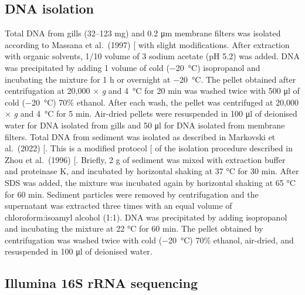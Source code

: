 \documentclass[
  12 pt,
]{article}
\begin{document}
\subsection{DNA isolation}\label{dna-isolation}

Total DNA from gills (32--123 \unit{\mg}) and 0.2 \unit{\um} membrane filters was isolated according to Massana et al.~(1997) {[}\citeproc{ref-Massana1997}{45}{]} with slight modifications. After extraction with organic solvents, 1/10 volume of 3 \unit{\Molar} sodium acetate (pH 5.2) was added. DNA was precipitated by adding 1 volume of cold (\qty{-20}{\degreeCelsius}) isopropanol and incubating the mixture for 1 \unit{\hour} or overnight at \qty{-20}{\degreeCelsius}. The pellet obtained after centrifugation at 20,000 × \emph{g} and \qty{4}{\degreeCelsius} for 20 \unit{\minute} was washed twice with 500 \unit{\ul} of cold (\qty{-20}{\degreeCelsius}) 70\unit{\percent} ethanol. After each wash, the pellet was centrifuged at 20,000 × \emph{g} and \qty{4}{\degreeCelsius} for 5 \unit{\minute}. Air-dried pellets were resuspended in 100 \unit{\ul} of deionised water for DNA isolated from gills and 50 \unit{\ul} for DNA isolated from membrane filters. Total DNA from sediment was isolated as described in Markovski et al.~(2022) {[}\citeproc{ref-Markovski2022}{46}{]}. This is a modified protocol {[}\citeproc{ref-Pjevac2018}{47}{]} of the isolation procedure described in Zhou et al.~(1996) {[}\citeproc{ref-Zhou1996}{48}{]}. Briefly, 2 \unit{\gram} of sediment was mixed with extraction buffer and proteinase K, and incubated by horizontal shaking at 37 \unit{\degreeCelsius} for 30 \unit{\minute}. After SDS was added, the mixture was incubated again by horizontal shaking at 65 \unit{\degreeCelsius} for 60 \unit{\minute}. Sediment particles were removed by centrifugation and the supernatant was extracted three times with an equal volume of chloroform:isoamyl alcohol (1:1). DNA was precipitated by adding isopropanol and incubating the mixture at 22 \unit{\degreeCelsius} for 60 \unit{\minute}. The pellet obtained by centrifugation was washed twice with cold (\qty{-20}{\degreeCelsius}) 70\unit{\percent} ethanol, air-dried, and resuspended in 100 \unit{\ul} of deionised water.

\subsection{Illumina 16S rRNA sequencing}\label{illumina-16s-rrna-sequencing}
\end{document}

